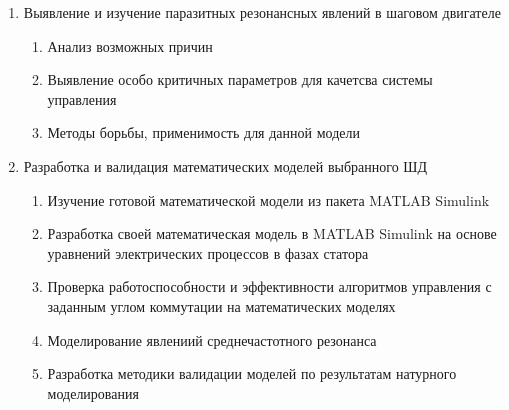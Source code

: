\begin{enumerate}
    \item{Выявление и изучение паразитных резонансных явлений в шаговом двигателе}
        \begin{enumerate}
            \item Анализ возможных причин
            \item Выявление особо критичных параметров для качетсва системы управления
            \item Методы борьбы, применимость для данной модели
        \end{enumerate}

    \item{Разработка и валидация математических моделей выбранного ШД}
        \begin{enumerate}
            \item Изучение готовой математической модели из пакета MATLAB Simulink
            \item Разработка своей математическая модель в MATLAB Simulink на основе
                    уравнений электрических процессов в фазах статора
            \item Проверка работоспособности и эффективности алгоритмов управления с заданным углом
                    коммутации на математических моделях
            \item Моделирование явлениий среднечастотного резонанса
            \item Разработка методики валидации моделей по результатам натурного моделирования
        \end{enumerate}
\end{enumerate}

\newpage
